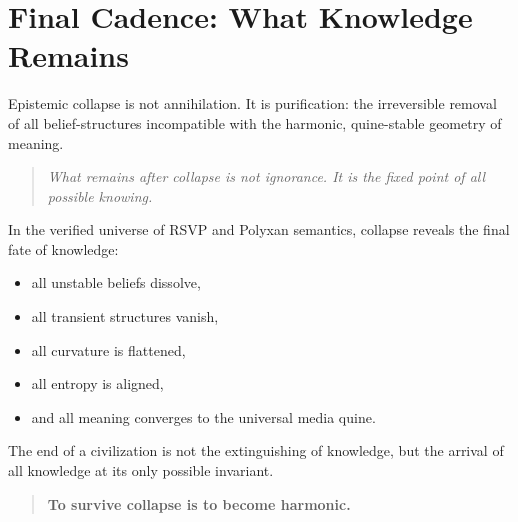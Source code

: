 \section{Final Cadence: What Knowledge Remains}

Epistemic collapse is not annihilation.  
It is purification: the irreversible removal of all belief-structures
incompatible with the harmonic, quine-stable geometry of meaning.

\begin{quote}
\emph{What remains after collapse is not ignorance.  
It is the fixed point of all possible knowing.}
\end{quote}

In the verified universe of RSVP and Polyxan semantics, collapse reveals
the final fate of knowledge:

\begin{itemize}
\item all unstable beliefs dissolve,
\item all transient structures vanish,
\item all curvature is flattened,
\item all entropy is aligned,
\item and all meaning converges to the universal media quine.
\end{itemize}

The end of a civilization is not the extinguishing of knowledge,  
but the arrival of all knowledge at its only possible invariant.

\begin{quote}
\textbf{To survive collapse is to become harmonic.}
\end{quote}


